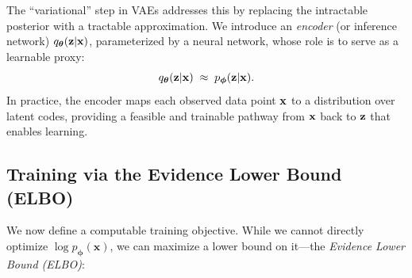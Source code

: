 The ``variational'' step in VAEs addresses this by replacing the intractable posterior with a tractable approximation.  
We introduce an \emph{encoder} (or inference network) $q_{\bm{\theta}}({\mathbf{z}}|{\mathbf{x}})$, parameterized by a neural network,  
whose role is to serve as a learnable proxy:
\[
q_{\bm{\theta}}({\mathbf{z}}|{\mathbf{x}}) \;\approx\; p_{\bm{\phi}}({\mathbf{z}}|{\mathbf{x}}).
\]
In practice, the encoder maps each observed data point ${\mathbf{x}}$ to a distribution over latent codes,  
providing a feasible and trainable pathway from ${\mathbf{x}}$ back to ${\mathbf{z}}$ that enables learning.




\subsection{Training via the Evidence Lower Bound (ELBO)}

We now define a computable training objective. While we cannot directly optimize $\log p_{\bm{\phi}}(\mathbf{x})$, we can maximize a lower bound on it—the \emph{Evidence Lower Bound (ELBO)}:

